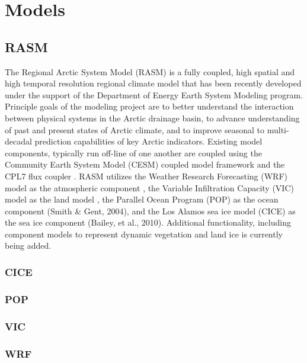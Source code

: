 \section{Models}

\subsection{RASM}

The Regional Arctic System Model (RASM) is a fully coupled, high spatial and high temporal resolution regional climate model that has been recently developed under the support of the Department of Energy Earth System Modeling program.
Principle goals of the modeling project are to better understand the interaction between physical systems in the Arctic drainage basin, to advance understanding of past and present states of Arctic climate, and to improve seasonal to multi-decadal prediction capabilities of key Arctic indicators.
Existing model components, typically run off-line of one another are coupled using the Community Earth System Model (CESM) coupled model framework and the CPL7 flux coupler \cite{Craig_2011}.
RASM utilizes the Weather Research Forecasting (WRF) model as the atmospheric component \cite{Skamarock_2008}, the Variable Infiltration Capacity (VIC) model as the land model \citep[e.g.][Hamman et al. In Review]{Liang_1996}, the Parallel Ocean Program (POP) as the ocean component (Smith & Gent, 2004), and the Los Alamos sea ice model (CICE) as the sea ice component (Bailey, et al., 2010).
Additional functionality, including component models to represent dynamic vegetation and land ice is currently being added.

\subsubsection{CICE}

\subsubsection{POP}

\subsubsection{VIC}

\subsubsection{WRF}

